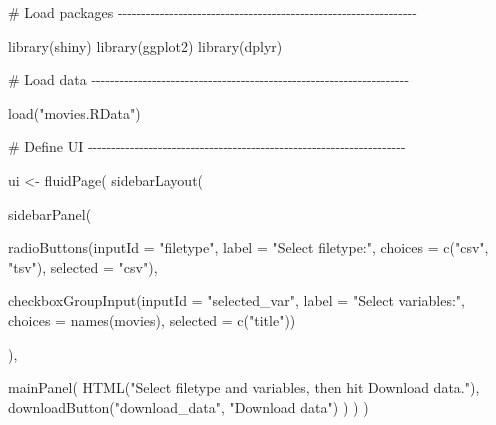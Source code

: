 \documentclass[
  letterpaper,
  DIV=11,
  numbers=noendperiod]{scrreprt}
\newenvironment{Shaded}{\begin{snugshade}}{\end{snugshade}}
\newcommand{\AttributeTok}[1]{\textcolor[rgb]{0.40,0.46,0.14}{#1}}
\newcommand{\CommentTok}[1]{\textcolor[rgb]{0.37,0.37,0.37}{#1}}
\newcommand{\FunctionTok}[1]{\textcolor[rgb]{0.28,0.35,0.67}{#1}}
\newcommand{\NormalTok}[1]{\textcolor[rgb]{0.00,0.46,0.62}{#1}}
\newcommand{\OtherTok}[1]{\textcolor[rgb]{0.00,0.46,0.62}{#1}}
\newcommand{\StringTok}[1]{\textcolor[rgb]{0.13,0.47,0.30}{#1}}
\begin{document}
\begin{Shaded}
\begin{Highlighting}[]
\CommentTok{\# Load packages {-}{-}{-}{-}{-}{-}{-}{-}{-}{-}{-}{-}{-}{-}{-}{-}{-}{-}{-}{-}{-}{-}{-}{-}{-}{-}{-}{-}{-}{-}{-}{-}{-}{-}{-}{-}{-}{-}{-}{-}{-}{-}{-}{-}{-}{-}{-}{-}{-}{-}{-}{-}{-}{-}{-}{-}{-}{-}{-}{-}{-}{-}{-}{-}}

\FunctionTok{library}\NormalTok{(shiny)}
\FunctionTok{library}\NormalTok{(ggplot2)}
\FunctionTok{library}\NormalTok{(dplyr)}

\CommentTok{\# Load data {-}{-}{-}{-}{-}{-}{-}{-}{-}{-}{-}{-}{-}{-}{-}{-}{-}{-}{-}{-}{-}{-}{-}{-}{-}{-}{-}{-}{-}{-}{-}{-}{-}{-}{-}{-}{-}{-}{-}{-}{-}{-}{-}{-}{-}{-}{-}{-}{-}{-}{-}{-}{-}{-}{-}{-}{-}{-}{-}{-}{-}{-}{-}{-}{-}{-}{-}{-}}

\FunctionTok{load}\NormalTok{(}\StringTok{"movies.RData"}\NormalTok{)}

\CommentTok{\# Define UI {-}{-}{-}{-}{-}{-}{-}{-}{-}{-}{-}{-}{-}{-}{-}{-}{-}{-}{-}{-}{-}{-}{-}{-}{-}{-}{-}{-}{-}{-}{-}{-}{-}{-}{-}{-}{-}{-}{-}{-}{-}{-}{-}{-}{-}{-}{-}{-}{-}{-}{-}{-}{-}{-}{-}{-}{-}{-}{-}{-}{-}{-}{-}{-}{-}{-}{-}{-}}

\NormalTok{ui }\OtherTok{\textless{}{-}} \FunctionTok{fluidPage}\NormalTok{(}
  \FunctionTok{sidebarLayout}\NormalTok{(}
    
    \FunctionTok{sidebarPanel}\NormalTok{(}
      
      \FunctionTok{radioButtons}\NormalTok{(}\AttributeTok{inputId =} \StringTok{"filetype"}\NormalTok{,}
                   \AttributeTok{label =} \StringTok{"Select filetype:"}\NormalTok{,}
                   \AttributeTok{choices =} \FunctionTok{c}\NormalTok{(}\StringTok{"csv"}\NormalTok{, }\StringTok{"tsv"}\NormalTok{),}
                   \AttributeTok{selected =} \StringTok{"csv"}\NormalTok{),}
      
      \FunctionTok{checkboxGroupInput}\NormalTok{(}\AttributeTok{inputId =} \StringTok{"selected\_var"}\NormalTok{,}
                         \AttributeTok{label =} \StringTok{"Select variables:"}\NormalTok{,}
                         \AttributeTok{choices =} \FunctionTok{names}\NormalTok{(movies),}
                         \AttributeTok{selected =} \FunctionTok{c}\NormalTok{(}\StringTok{"title"}\NormalTok{))}
      
\NormalTok{    ),}
    
    \FunctionTok{mainPanel}\NormalTok{(}
      \FunctionTok{HTML}\NormalTok{(}\StringTok{"Select filetype and variables, then hit \textquotesingle{}Download data\textquotesingle{}."}\NormalTok{),}
      \FunctionTok{downloadButton}\NormalTok{(}\StringTok{"download\_data"}\NormalTok{, }\StringTok{"Download data"}\NormalTok{)}
\NormalTok{    )}
\NormalTok{  )}
\NormalTok{)}


\end{Highlighting}
\end{Shaded}
\end{document}
